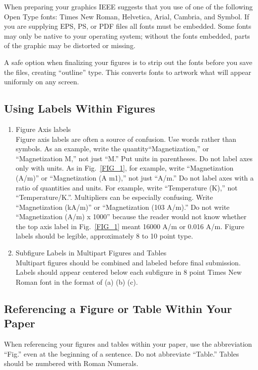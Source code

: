 \documentclass[journal]{IEEEtranTIE}
\begin{document}
When preparing your graphics IEEE suggests that you use of one of the following Open Type fonts: Times New Roman, Helvetica, Arial, Cambria, and Symbol. If you are supplying EPS, PS, or PDF files all fonts must be embedded. Some fonts may only be native to your operating system; without the fonts embedded, parts of the graphic may be distorted or missing.

A safe option when finalizing your figures is to strip out the fonts before you save the files, creating ``outline'' type. This converts fonts to artwork what will appear uniformly on any screen.


\subsection{Using Labels Within Figures}

\begin{enumerate}
	\item Figure Axis labels\\
	Figure axis labels are often a source of confusion. Use words rather than symbols. As an example, write the quantity``Magnetization,'' or ``Magnetization M,'' not just ``M.'' Put units in parentheses. Do not label axes only with units. As in \mbox{Fig. \ref{FIG_1}}, for example, write ``Magnetization (A/m)'' or ``Magnetization (A m1),'' not just ``A/m.'' Do not label axes with a ratio of quantities and units. For example, write ``Temperature (K),'' not ``Temperature/K.''. Multipliers can be especially confusing. Write ``Magnetization (kA/m)'' or ``Magnetization (103 A/m).'' Do not write ``Magnetization (A/m) x 1000'' because the reader would not know whether the top axis label in \mbox{Fig. \ref{FIG_1}} meant 16000 A/m or 0.016 A/m. Figure labels should be legible, approximately 8 to 10 point type.
	\item Subfigure Labels in Multipart Figures and Tables\\
	Multipart figures should be combined and labeled before final submission. Labels should appear centered below each subfigure in 8 point Times New Roman font in the format of (a) (b) (c).
\end{enumerate}

\subsection{Referencing a Figure or Table Within Your Paper}
When referencing your figures and tables within your paper, use the abbreviation ``Fig.'' even at the beginning of a sentence. Do not abbreviate ``Table.'' Tables should be numbered with Roman Numerals.
\end{document}
